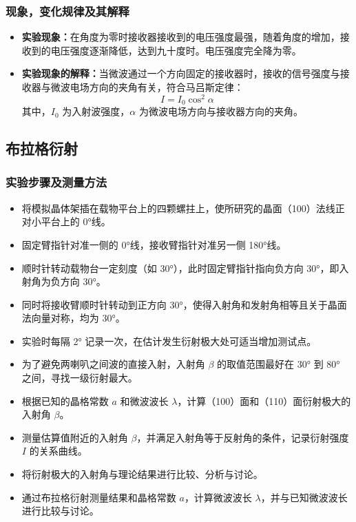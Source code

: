 \documentclass[zihao=5, UTF8]{article}
\theoremstyle{MyLineTheoremStyle} %
\theoremstyle{MyBlockTheoremStyle} %
\theoremstyle{MySubsubsectionStyle} %
\begin{document}
\subsubsection{现象，变化规律及其解释}
\begin{itemize}
    \item \textbf{实验现象：}在角度为零时接收器接收到的电压强度最强，随着角度的增加，接收到的电压强度逐渐降低，达到九十度时。电压强度完全降为零。
    \item \textbf{实验现象的解释：}当微波通过一个方向固定的接收器时，接收的信号强度与接收器与微波电场方向的夹角有关，符合马吕斯定律：
\[
I = I_0 \cos^2 \alpha
\]
其中，$I_0$ 为入射波强度，$\alpha$ 为微波电场方向与接收器方向的夹角。

\end{itemize}

\subsection{布拉格衍射}
\subsubsection{实验步骤及测量方法}
\begin{itemize}
    \item 将模拟晶体架插在载物平台上的四颗螺拄上，使所研究的晶面（100）法线正对小平台上的 0°线。
    \item 固定臂指针对准一侧的 0°线，接收臂指针对准另一侧 180°线。
    \item 顺时针转动载物台一定刻度（如 30°），此时固定臂指针指向负方向 30°，即入射角为负方向 30°。
    \item 同时将接收臂顺时针转动到正方向 30°，使得入射角和发射角相等且关于晶面法向量对称，均为 30°。
    \item 实验时每隔 2° 记录一次，在估计发生衍射极大处可适当增加测试点。
    \item 为了避免两喇叭之间波的直接入射，入射角 $\beta$ 的取值范围最好在 30° 到 80° 之间，寻找一级衍射最大。
    \item 根据已知的晶格常数 $a$ 和微波波长 $\lambda$，计算（100）面和（110）面衍射极大的入射角 $\beta$。
    \item 测量估算值附近的入射角 $\beta$，并满足入射角等于反射角的条件，记录衍射强度 $I$ 的关系曲线。
    \item 将衍射极大的入射角与理论结果进行比较、分析与讨论。
    \item 通过布拉格衍射测量结果和晶格常数 $a$，计算微波波长 $\lambda$，并与已知微波波长进行比较与讨论。
\end{itemize}
\end{document}
